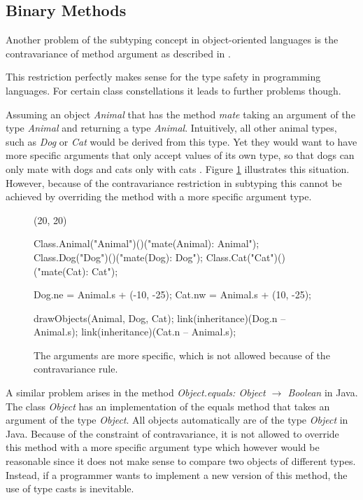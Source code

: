 \subsection{Binary Methods}
\label{sec:recursiveClosure}
 Another problem of the subtyping concept in
object-oriented languages is the contravariance of method argument as
described in .

This restriction perfectly makes sense for the type safety in programming
languages. For certain class constellations it leads to further problems
though.

Assuming an object \emph{Animal} that has the method \emph{mate}
taking an argument of the type \emph{Animal} and returning a type
\emph{Animal}. Intuitively, all other animal types, such as \emph{Dog}
or \emph{Cat} would be derived from this type. Yet they would want
to have more specific arguments that only accept values of its own
type, so that dogs can only mate with dogs and cats only with cats
\cite{simons_theory_2003-1}. Figure \ref{fig:animalContravariance}
illustrates this situation. However, because of the contravariance
restriction in subtyping this cannot be achieved by overriding the method
with a more specific argument type.

\begin{figure}[H]
	\centering
	\begin{emp}[classdiag](20, 20)

		Class.Animal("Animal")()("mate(Animal): Animal");
		Class.Dog("Dog")()("mate(Dog): Dog");
		Class.Cat("Cat")()("mate(Cat): Cat");

		Dog.ne = Animal.s + (-10, -25);
		Cat.nw = Animal.s + (10, -25);

		drawObjects(Animal, Dog, Cat);
		link(inheritance)(Dog.n -- Animal.s);
		link(inheritance)(Cat.n -- Animal.s);

	\end{emp}
	\caption[More specific arguments.]{The arguments are more specific, which is not allowed because of the contravariance rule.}
	\label{fig:animalContravariance}
\end{figure}

A similar problem arises in the method \emph{Object.equals: Object
$\rightarrow$ Boolean} in Java. The class \emph{Object} has an
implementation of the equals method that takes an argument of the type
\emph{Object}. All objects automatically are of the type \emph{Object}
in Java. Because of the constraint of contravariance, it is not allowed
to override this method with a more specific argument type which however
would be reasonable since it does not make sense to compare two objects
of different types. Instead, if a programmer wants to implement a new
version of this method, the use of type casts is inevitable.

